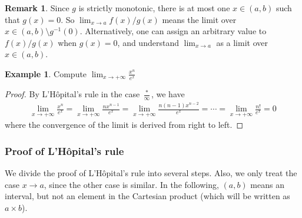 \documentclass[12pt,b5paper,notitlepage]{article}
\theoremstyle{definition}
\newtheorem{eg}[df]{Example}
\newtheorem{rem}[df]{Remark}
\theoremstyle{plain}
\newcommand{\dps}{\displaystyle}
\numberwithin{equation}{section}
\begin{document}
\begin{rem}
Since $g$ is strictly monotonic, there is at most one $x\in(a,b)$ such that $g(x)=0$. So $\lim_{x\rightarrow a}f(x)/g(x)$ means the limit over $x\in (a,b)\setminus g^{-1}(0)$. Alternatively, one can assign an arbitrary value to $f(x)/g(x)$ when $g(x)=0$, and understand $\lim_{x\rightarrow a}$ as a limit over $x\in (a,b)$.
\end{rem}


\begin{eg}
Compute $\dps\lim_{x\rightarrow+\infty}\frac{x^n}{e^x}$
\end{eg}

\begin{proof}
By L'H\^opital's rule in the case $\frac *\infty$, we have
\begin{align*}
\lim_{x\rightarrow+\infty}\frac{x^n}{e^x}=\lim_{x\rightarrow+\infty}\frac{nx^{n-1}}{e^x}=\lim_{x\rightarrow+\infty}\frac{n(n-1)x^{n-2}}{e^x}=\cdots=\lim_{x\rightarrow+\infty}\frac{n!}{e^x}=0
\end{align*}
where the convergence of the limit is derived from right to left.
\end{proof}




\subsubsection{Proof of L'H\^opital's rule}\label{lb349}




We divide the proof of L'H\^opital's rule into several steps. Also, we only treat the case $x\rightarrow a$, since the other case is similar. In the following, $(a,b)$ means an interval, but not an element in the Cartesian product (which will be written as $a\times b$).
\end{document}
